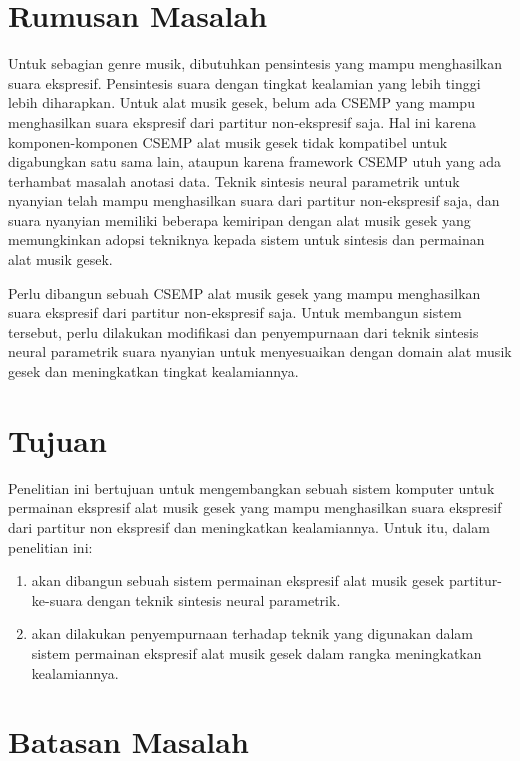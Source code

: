 \section{Rumusan Masalah}

Untuk sebagian genre musik, dibutuhkan pensintesis yang mampu menghasilkan suara ekspresif. Pensintesis suara dengan tingkat kealamian yang lebih tinggi lebih diharapkan. Untuk alat musik gesek, belum ada CSEMP yang mampu menghasilkan suara ekspresif dari partitur non-ekspresif saja. Hal ini karena komponen-komponen CSEMP alat musik gesek tidak kompatibel untuk digabungkan satu sama lain, ataupun karena framework CSEMP utuh yang ada terhambat masalah anotasi data. Teknik sintesis neural parametrik untuk nyanyian telah mampu menghasilkan suara dari partitur non-ekspresif saja, dan suara nyanyian memiliki beberapa kemiripan dengan alat musik gesek yang memungkinkan adopsi tekniknya kepada sistem untuk sintesis dan permainan alat musik gesek.

Perlu dibangun sebuah CSEMP alat musik gesek yang mampu menghasilkan suara ekspresif dari partitur non-ekspresif saja. Untuk membangun sistem tersebut, perlu dilakukan modifikasi dan penyempurnaan dari teknik sintesis neural parametrik suara nyanyian untuk menyesuaikan dengan domain alat musik gesek dan meningkatkan tingkat kealamiannya.

\section{Tujuan}

Penelitian ini bertujuan untuk mengembangkan sebuah sistem komputer untuk permainan ekspresif alat musik gesek yang mampu menghasilkan suara ekspresif dari partitur non ekspresif dan meningkatkan kealamiannya. Untuk itu, dalam penelitian ini:
\begin{enumerate}
	\item akan dibangun sebuah sistem permainan ekspresif alat musik gesek partitur-ke-suara dengan teknik sintesis neural parametrik.
	\item akan dilakukan penyempurnaan terhadap teknik yang digunakan dalam sistem permainan ekspresif alat musik gesek dalam rangka meningkatkan kealamiannya.
\end{enumerate}

\section{Batasan Masalah}

